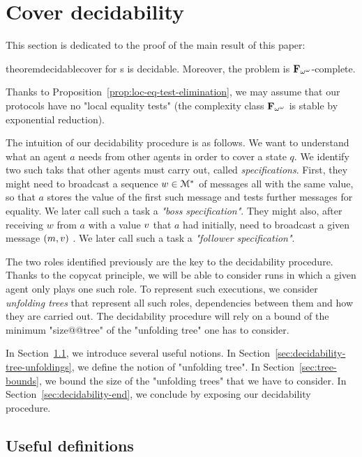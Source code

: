 \section{Cover decidability}
\label{sec:cover-decidability}

This section is dedicated to the proof of the main result of this paper:

\begin{restatable}{theorem}{decidablecover}
\label{thm:decidable-cover}
\COVER for \BNRA{}s is decidable. Moreover, the problem is $\mathbf{F}_{\omega^\omega}$-complete.
\end{restatable}

Thanks to Proposition~\ref{prop:loc-eq-test-elimination}, we may assume that our protocols have no "local equality tests" (the complexity class $\mathbf{F}_{\omega^{\omega}}$ is stable by exponential reduction).

The intuition of our decidability procedure is as follows. 
We want to understand what an agent $a$ needs from other agents in order to cover a state $q$. We identify two such taks that other agents must carry out, called \emph{specifications}. First, they might need to broadcast a sequence $w \in \mathcal{M}^*$ of messages all with the same value, so that $a$ stores the value of the first such message and tests further messages for equality. We later call such a task a \emph{"boss specification"}.  
They might also, after receiving $w$ from $a$ with a value $v$ that $a$ had initially, need to broadcast a given message $(m,v)$ . We later call such a task a \emph{"follower specification"}.

The two roles identified previously are the key to the decidability procedure. Thanks to the copycat principle, we will be able to consider runs in which a given agent only plays one such role. To represent such executions, we consider \emph{unfolding trees} that represent all such roles, dependencies between them and how they are carried out. The decidability procedure will rely on a bound of the minimum "size@@tree" of the "unfolding tree" one has to consider.

In Section~\ref{sec:decidability-defs}, we introduce several useful notions. In Section~\ref{sec:decidability-tree-unfoldings}, we define the notion of "unfolding tree". In Section~\ref{sec:tree-bounds}, we bound the size of the "unfolding trees" that we have to consider. In Section~\ref{sec:decidability-end}, we conclude by exposing our decidability procedure. 


\subsection{Useful definitions}
\label{sec:decidability-defs}

